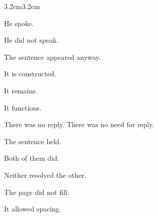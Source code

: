 \begin{adjustwidth}{3.2cm}{3.2cm}
\vspace{2em}

He spoke.

\medskip

He did not speak.

\medskip

The sentence appeared anyway.

\medskip

It is constructed.

\medskip

It remains.

\medskip

It functions.

\vspace{1em}

There was no reply. There was no need for reply.

\vspace{2em}


\medskip


\medskip


\vspace{1em}


\vspace{3em}

\begin{center}
\end{center}

\vspace{3em}

The sentence held.

\medskip

Both of them did.

\medskip

Neither resolved the other.

\vspace{3em}

The page did not fill.

\vspace{2em}

It allowed spacing.


\end{adjustwidth}
